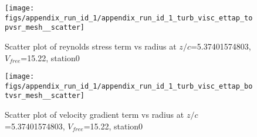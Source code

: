 \begin{figure}[H]
\centering
\texttt{[image: figs/appendix\_run\_id\_1/appendix\_run\_id\_1\_turb\_visc\_ettap\_topvsr\_mesh\_\_scatter]}
\caption{Scatter plot of reynolds stress term vs radius at $z/c$=5.37401574803, $V_{free}$=15.22, station0}
\label{fig:appendix_run_id_1_turb_visc_ettap_topvsr_mesh__scatter}
\end{figure}


\begin{figure}[H]
\centering
\texttt{[image: figs/appendix\_run\_id\_1/appendix\_run\_id\_1\_turb\_visc\_ettap\_botvsr\_mesh\_\_scatter]}
\caption{Scatter plot of velocity gradient term vs radius at $z/c$=5.37401574803, $V_{free}$=15.22, station0}
\label{fig:appendix_run_id_1_turb_visc_ettap_botvsr_mesh__scatter}
\end{figure}


